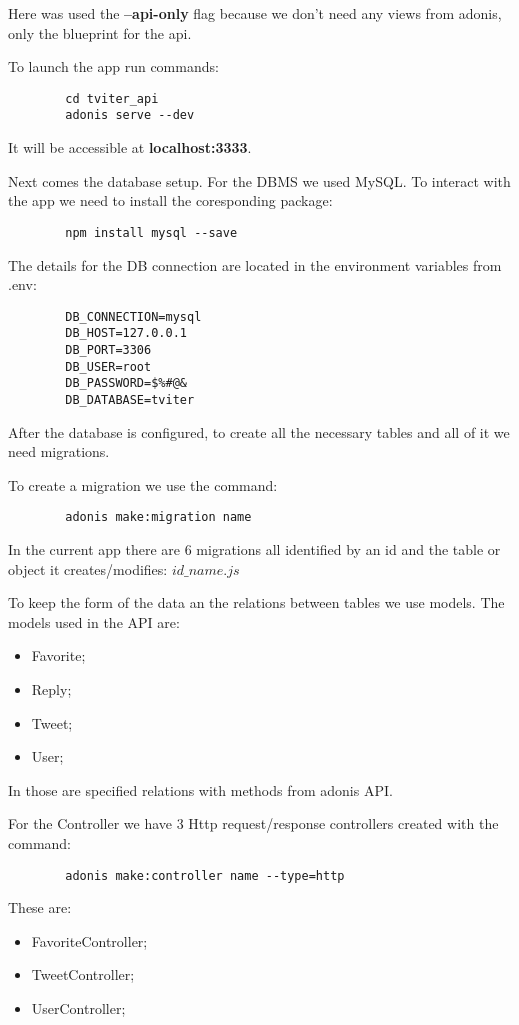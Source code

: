 	Here was used the \textbf{--api-only} flag because we don't need any views from adonis, only the blueprint for the api.
	
	To launch the app run commands:
	\begin{verbatim}
		cd tviter_api
		adonis serve --dev
	\end{verbatim}
	
	It will be accessible at \textbf{localhost:3333}.
	
	Next comes the database setup. For the DBMS we used MySQL. To interact with the app we need to install the coresponding package:
	\begin{verbatim}
		npm install mysql --save
	\end{verbatim} 
	
	The details for the DB connection are located in the environment variables from .env:
	\begin{verbatim}
		DB_CONNECTION=mysql
		DB_HOST=127.0.0.1
		DB_PORT=3306
		DB_USER=root
		DB_PASSWORD=$%#@&
		DB_DATABASE=tviter
	\end{verbatim}
	
	After the database is configured, to create all the necessary tables and all of it we need migrations.
	
	To create a migration we use the command:
	\begin{verbatim}
		adonis make:migration name
	\end{verbatim} 
	
	In the current app there are 6 migrations all identified by an id and the table or object it creates/modifies: $id\_name.js$
	
	To keep the form of the data an the relations between tables we use models. The models used in the API are: 
	\begin{itemize}
		\item Favorite;
		\item Reply;
		\item Tweet;
		\item User;
	\end{itemize}
	
	In those are specified relations with methods from adonis API.
	
	For the Controller we have 3 Http request/response controllers created with the command:
	\begin{verbatim}
		adonis make:controller name --type=http
	\end{verbatim}
	
	These are:
	\begin{itemize}
		\item FavoriteController;
		\item TweetController;
		\item UserController;
	\end{itemize}

